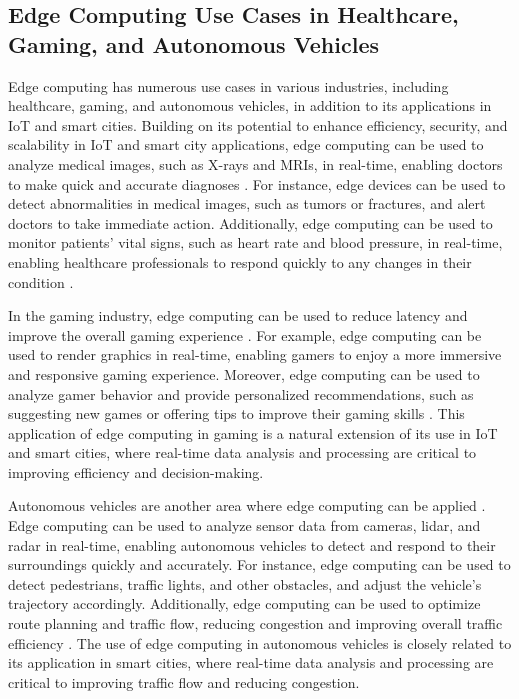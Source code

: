 \documentclass[11pt]{article}
\begin{document}
\subsection{Edge Computing Use Cases in Healthcare, Gaming, and Autonomous Vehicles}

Edge computing has numerous use cases in various industries, including healthcare, gaming, and autonomous vehicles, in addition to its applications in IoT and smart cities. Building on its potential to enhance efficiency, security, and scalability in IoT and smart city applications, edge computing can be used to analyze medical images, such as X-rays and MRIs, in real-time, enabling doctors to make quick and accurate diagnoses \cite{ref44}. For instance, edge devices can be used to detect abnormalities in medical images, such as tumors or fractures, and alert doctors to take immediate action. Additionally, edge computing can be used to monitor patients' vital signs, such as heart rate and blood pressure, in real-time, enabling healthcare professionals to respond quickly to any changes in their condition \cite{ref45}.

In the gaming industry, edge computing can be used to reduce latency and improve the overall gaming experience \cite{ref46}. For example, edge computing can be used to render graphics in real-time, enabling gamers to enjoy a more immersive and responsive gaming experience. Moreover, edge computing can be used to analyze gamer behavior and provide personalized recommendations, such as suggesting new games or offering tips to improve their gaming skills \cite{ref2}. This application of edge computing in gaming is a natural extension of its use in IoT and smart cities, where real-time data analysis and processing are critical to improving efficiency and decision-making.

Autonomous vehicles are another area where edge computing can be applied \cite{ref47}. Edge computing can be used to analyze sensor data from cameras, lidar, and radar in real-time, enabling autonomous vehicles to detect and respond to their surroundings quickly and accurately. For instance, edge computing can be used to detect pedestrians, traffic lights, and other obstacles, and adjust the vehicle's trajectory accordingly. Additionally, edge computing can be used to optimize route planning and traffic flow, reducing congestion and improving overall traffic efficiency \cite{ref48}. The use of edge computing in autonomous vehicles is closely related to its application in smart cities, where real-time data analysis and processing are critical to improving traffic flow and reducing congestion.
\end{document}
